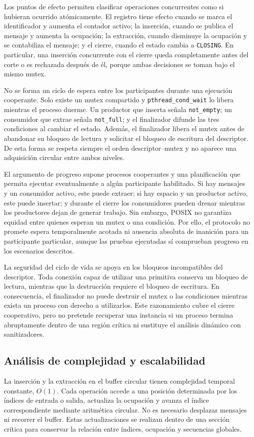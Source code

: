 \documentclass[conference]{IEEEtran}
\begin{document}
Los puntos de efecto permiten clasificar operaciones concurrentes como si hubieran ocurrido atómicamente. El registro tiene efecto cuando se marca el identificador y aumenta el contador activo; la inserción, cuando se publica el mensaje y aumenta la ocupación; la extracción, cuando disminuye la ocupación y se contabiliza el mensaje; y el cierre, cuando el estado cambia a \texttt{CLOSING}. En particular, una inserción concurrente con el cierre queda completamente antes del corte o es rechazada después de él, porque ambas decisiones se toman bajo el mismo mutex.

No se forma un ciclo de espera entre los participantes durante una ejecución cooperante. Solo existe un mutex compartido y \texttt{pthread\_cond\_wait} lo libera mientras el proceso duerme. Un productor que inserta señala \texttt{not\_empty}; un consumidor que extrae señala \texttt{not\_full}; y el finalizador difunde las tres condiciones al cambiar el estado. Además, el finalizador libera el mutex antes de abandonar su bloqueo de lectura y solicitar el bloqueo de escritura del descriptor. De esta forma se respeta siempre el orden descriptor--mutex y no aparece una adquisición circular entre ambos niveles.

El argumento de progreso supone procesos cooperantes y una planificación que permita ejecutar eventualmente a algún participante habilitado. Si hay mensajes y un consumidor activo, este puede extraer; si hay espacio y un productor activo, este puede insertar; y durante el cierre los consumidores pueden drenar mientras los productores dejan de generar trabajo. Sin embargo, POSIX no garantiza equidad entre quienes esperan un mutex o una condición. Por ello, el protocolo no promete espera temporalmente acotada ni ausencia absoluta de inanición para un participante particular, aunque las pruebas ejecutadas sí comprueban progreso en los escenarios descritos.

La seguridad del ciclo de vida se apoya en los bloqueos incompatibles del descriptor. Toda conexión capaz de utilizar una primitiva conserva un bloqueo de lectura, mientras que la destrucción requiere el bloqueo de escritura. En consecuencia, el finalizador no puede destruir el mutex o las condiciones mientras exista un proceso con derecho a utilizarlos. Este razonamiento cubre el cierre cooperativo, pero no pretende recuperar una instancia si un proceso termina abruptamente dentro de una región crítica ni sustituye el análisis dinámico con sanitizadores.

\subsection{Análisis de complejidad y escalabilidad}
La inserción y la extracción en el buffer circular tienen complejidad temporal constante, $O(1)$. Cada operación accede a una posición determinada por los índices de entrada o salida, actualiza la ocupación y avanza el índice correspondiente mediante aritmética circular. No es necesario desplazar mensajes ni recorrer el buffer. Estas actualizaciones se realizan dentro de una sección crítica para conservar la relación entre índices, ocupación y secuencias globales.
\end{document}
